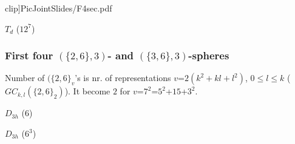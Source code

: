 \documentclass{beamer}
\begin{document}
\begin{frame}
\begin{center}
\begin{minipage}[b]{24mm}
{clip]{PicJointSlides/F4sec.pdf}}\par
 $T_{d}$ ($12^7$)
\end{minipage}\end{center}
\end{frame}

\begin{frame}\frametitle{First four $(\{2,6\},3)$- and
$(\{3,6\},3)$-spheres}
\vspace{-1.5mm}
 Number  of $(\{2,6\}_v$'s is nr. of representations $v$=$2(k^2+kl+l^2)$,
$0\le l\le k$ ($GC_{k,l}(\{2,6\}_2)$). It become $2$ for
$v$=$7^2$=$5^2$+$15$+$3^2$.

\begin{center}
\begin{minipage}[b]{25mm}
\centering
{}\par
$D_{3h}$ ($6$)
\end{minipage}
\begin{minipage}[b]{23mm}
\centering
{}\par
$D_{3h}$ ($6^3$)
\end{minipage}
\begin{minipage}[b]{18mm}
\centering
{}\par

\end{minipage}
\end{center}
\end{frame}
\end{document}
